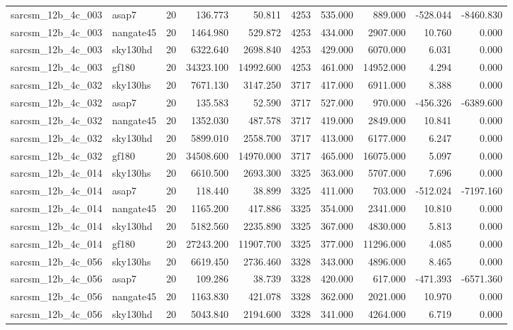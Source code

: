 \documentclass{article}
\begin{document}
\begin{longtable}{llrrrrrrrr}
sarcsm\_12b\_4c\_003 & asap7 & 20 & 136.773 & 50.811 & 4253 & 535.000 & 889.000 & -528.044 & -8460.830 \\
sarcsm\_12b\_4c\_003 & nangate45 & 20 & 1464.980 & 529.872 & 4253 & 434.000 & 2907.000 & 10.760 & 0.000 \\
sarcsm\_12b\_4c\_003 & sky130hd & 20 & 6322.640 & 2698.840 & 4253 & 429.000 & 6070.000 & 6.031 & 0.000 \\
sarcsm\_12b\_4c\_003 & gf180 & 20 & 34323.100 & 14992.600 & 4253 & 461.000 & 14952.000 & 4.294 & 0.000 \\
sarcsm\_12b\_4c\_032 & sky130hs & 20 & 7671.130 & 3147.250 & 3717 & 417.000 & 6911.000 & 8.388 & 0.000 \\
sarcsm\_12b\_4c\_032 & asap7 & 20 & 135.583 & 52.590 & 3717 & 527.000 & 970.000 & -456.326 & -6389.600 \\
sarcsm\_12b\_4c\_032 & nangate45 & 20 & 1352.030 & 487.578 & 3717 & 419.000 & 2849.000 & 10.841 & 0.000 \\
sarcsm\_12b\_4c\_032 & sky130hd & 20 & 5899.010 & 2558.700 & 3717 & 413.000 & 6177.000 & 6.247 & 0.000 \\
sarcsm\_12b\_4c\_032 & gf180 & 20 & 34508.600 & 14970.000 & 3717 & 465.000 & 16075.000 & 5.097 & 0.000 \\
sarcsm\_12b\_4c\_014 & sky130hs & 20 & 6610.500 & 2693.300 & 3325 & 363.000 & 5707.000 & 7.696 & 0.000 \\
sarcsm\_12b\_4c\_014 & asap7 & 20 & 118.440 & 38.899 & 3325 & 411.000 & 703.000 & -512.024 & -7197.160 \\
sarcsm\_12b\_4c\_014 & nangate45 & 20 & 1165.200 & 417.886 & 3325 & 354.000 & 2341.000 & 10.810 & 0.000 \\
sarcsm\_12b\_4c\_014 & sky130hd & 20 & 5182.560 & 2235.890 & 3325 & 367.000 & 4830.000 & 5.813 & 0.000 \\
sarcsm\_12b\_4c\_014 & gf180 & 20 & 27243.200 & 11907.700 & 3325 & 377.000 & 11296.000 & 4.085 & 0.000 \\
sarcsm\_12b\_4c\_056 & sky130hs & 20 & 6619.450 & 2736.460 & 3328 & 343.000 & 4896.000 & 8.465 & 0.000 \\
sarcsm\_12b\_4c\_056 & asap7 & 20 & 109.286 & 38.739 & 3328 & 420.000 & 617.000 & -471.393 & -6571.360 \\
sarcsm\_12b\_4c\_056 & nangate45 & 20 & 1163.830 & 421.078 & 3328 & 362.000 & 2021.000 & 10.970 & 0.000 \\
sarcsm\_12b\_4c\_056 & sky130hd & 20 & 5043.840 & 2194.600 & 3328 & 341.000 & 4264.000 & 6.719 & 0.000 \\

\end{longtable}
\end{document}
